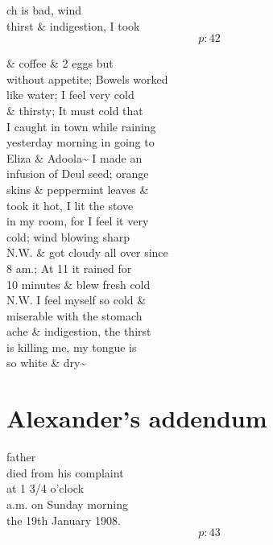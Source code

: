 \documentclass{report}
\begin{document}
	\par{
 	ch is bad, wind\ \\thirst \& indigestion, I took\ \\
  \[p: 42 \]

	}

	\par{
 	\& coffee \& 2 eggs but\ \\without appetite; Bowels worked\ \\like water; I feel very cold\ \\\& thirsty; It must cold that\ \\I caught in town while raining\ \\yesterday morning in going to\ \\Eliza \& Adoola\~{} I made an\ \\infusion of Deul seed; orange\ \\skins \& peppermint leaves \&\ \\took it hot, I lit the stove\ \\in my room, for I feel it very\ \\cold; wind blowing sharp\ \\N.W. \& got cloudy all over since\ \\8 am.; At 11 it rained for\ \\10 minutes \& blew fresh cold\ \\N.W. I feel myself so cold \&\ \\miserable with the stomach\ \\ache \& indigestion, the thirst\ \\is killing me, my tongue is\ \\so white \& dry\~{}\ \\
	}

	\chapter{\lbrack Alexander's addendum\rbrack\ \\}

	\par{
 	
	}

	\par{
 	father\ \\died from his complaint\ \\at 1 3/4 o'clock\ \\a.m. on Sunday morning\ \\the 19th January 1908.\ \\
  \[p: 43 \]

	}
\end{document}
